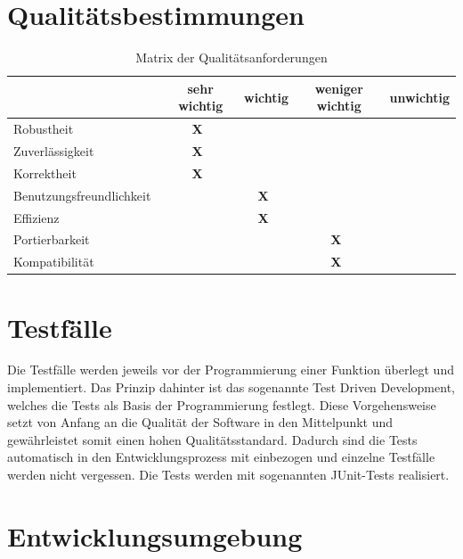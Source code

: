 \documentclass[12pt,oneside,a4paper,bibtotoc,liststotoc,pointlessnumbers]{scrartcl}
\begin{document}
\clearpage

\newpage
\section{Qualitätsbestimmungen}
\begin{table}[h]							
\begin{center}
 \begin{tabular}{l|c|c|c|c}
  ~ & sehr wichtig & wichtig & weniger wichtig & unwichtig\\
  \hline \hline
  Robustheit~ & \textbf{X}~ &  ~ ~ ~ &  ~ ~ ~ &  ~ ~ ~ \\
  \hline
  Zuverlässigkeit~ & \textbf{X}~ &  ~ ~ ~ &  ~ ~ ~ &  ~ ~ ~ \\
  \hline
  Korrektheit~ & \textbf{X}~ &  ~ ~ ~ &  ~ ~ ~ &  ~ ~ ~ \\
  \hline
  Benutzungsfreundlichkeit~ &  ~ ~ ~ & \textbf{X}~ &  ~ ~ ~ &  ~ ~ ~ \\
  \hline
  Effizienz~ &  ~ ~ ~ & \textbf{X}~ &  ~ ~ ~ &  ~ ~ ~ \\
  \hline
  Portierbarkeit~ &  ~ ~ ~ &  ~ ~ ~ & \textbf{X}~ &  ~ ~ ~ \\
  \hline
  Kompatibilität~ &  ~ ~ ~ &  ~ ~ ~ & \textbf{X}~ &  ~ ~ ~ \\
 \end{tabular}
\end{center}
\caption{Matrix der Qualitätsanforderungen}									%
\label{fig:Qualitaet}												%
\end{table}


\newpage
\section{Testfälle}
Die Testfälle werden jeweils vor der Programmierung einer Funktion überlegt und implementiert. Das Prinzip dahinter ist das sogenannte
Test Driven Development, welches die Tests als Basis der Programmierung festlegt. Diese Vorgehensweise setzt von Anfang an die Qualität
der Software in den Mittelpunkt und gewährleistet somit einen hohen Qualitätsstandard. Dadurch sind die Tests automatisch in den 
Entwicklungsprozess mit einbezogen und einzelne Testfälle werden nicht vergessen. Die Tests werden mit sogenannten JUnit-Tests realisiert.

\newpage
\section{Entwicklungsumgebung}
\end{document}
